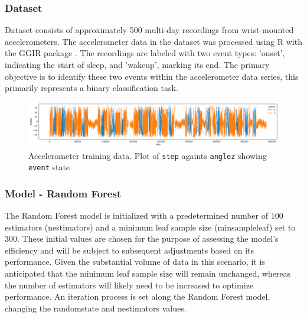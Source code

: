 \documentclass[10pt]{beamer}
\begin{document}
\begin{frame}
  \frametitle{Dataset}
  \begin{block}{}
    Dataset consists of approximately 500 multi-day recordings from wrist-mounted accelerometers. The accelerometer data in the dataset was processed using R with the GGIR package \cite{Migueles2019GGIR}. The recordings are labeled with two event types: 'onset', indicating the start of sleep, and 'wakeup', marking its end. The primary objective is to identify these two events within the accelerometer data series, this primarily represents a binary classification task. 
    \begin{figure}
        \centering
        \includegraphics[width=1\linewidth]{038441c925bb_anglez.png}
        \caption{Accelerometer training data. Plot of \texttt{step} againts \texttt{anglez} showing \texttt{event} state}
        \label{fig:accelerometerdata_series-038441c925bb_anglez}
    \end{figure}
  \end{block} 
\end{frame}

\begin{frame}
  \frametitle{Model - Random Forest}
  \begin{block}{}
    The Random Forest model is initialized with a predetermined number of 100 estimators (n\textunderscore estimators)
and a minimum leaf sample size (min\textunderscore sample\textunderscore leaf) set to 300. These initial values are chosen for
the purpose of assessing the model’s efficiency and will be subject to subsequent adjustments based
on its performance. Given the substantial volume of data in this scenario, it is anticipated that the
minimum leaf sample size will remain unchanged, whereas the number of estimators will likely need
to be increased to optimize performance. An iteration process is set along the Random Forest model, changing the random\textunderscore state and n\textunderscore estimators values.
\begin{center}
\end{center}
  \end{block} 
\end{frame}
\end{document}
